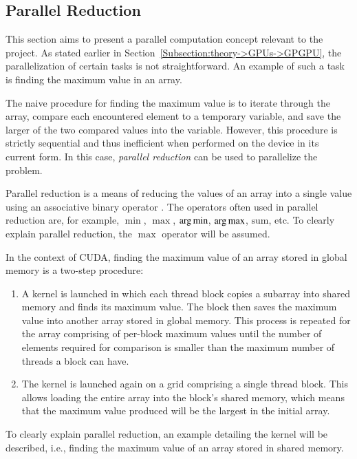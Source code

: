 \subsection{Parallel Reduction}\label{Subsection:theory->CUDA->parallel-reduction}
This section aims to present a parallel computation concept relevant to the project.
As stated earlier in Section~\ref{Subsection:theory->GPUs->GPGPU}, the parallelization of certain tasks is not straightforward.
An example of such a task is finding the maximum value in an array.

The naive procedure for finding the maximum value is to iterate through the array, compare each encountered element to a temporary variable, and save the larger of the two compared values into the variable.
However, this procedure is strictly sequential and thus inefficient when performed on the device in its current form.
In this case, \textit{parallel reduction} can be used to parallelize the problem.

Parallel reduction is a means of reducing the values of an array into a single value using an associative binary operator \cite{Kirk2013}.
The operators often used in parallel reduction are, for example, $\min$, $\max$, $\operatorname*{arg\,min}$, $\operatorname*{arg\,max}$, $\mathrm{sum}$, etc.
To clearly explain parallel reduction, the $\max$ operator will be assumed.

In the context of CUDA, finding the maximum value of an array stored in global memory is a two-step procedure:

\begin{enumerate}
	\item A kernel is launched in which each thread block copies a subarray into shared memory and finds its maximum value.
The block then saves the maximum value into another array stored in global memory.
This process is repeated for the array comprising of per-block maximum values until the number of elements required for comparison is smaller than the maximum number of threads a block can have.
	\item The kernel is launched again on a grid comprising a single thread block.
This allows loading the entire array into the block's shared memory, which means that the maximum value produced will be the largest in the initial array.
\end{enumerate}

To clearly explain parallel reduction, an example detailing the kernel will be described, i.e., finding the maximum value of an array stored in shared memory.


